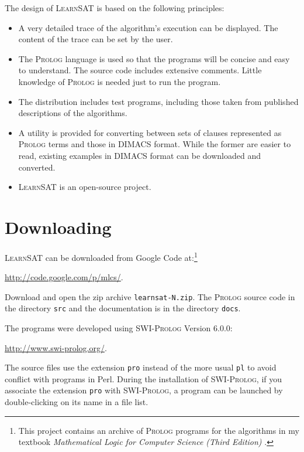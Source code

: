 \documentclass[11pt]{article}
\newcommand*{\p}[1]{\textup{\texttt{#1}}}
\newcommand*{\ls}{\textsc{LearnSAT}}
\newcommand*{\pl}{\textsc{Prolog}}
\newcommand*{\sw}{\textsc{SWI-Prolog}}
\begin{document}
The design of \ls{} is based on the following principles:

\begin{itemize}

\item A very detailed trace of the algorithm's execution can be
displayed. The content of the trace can be set by the user.

\item The \pl{} language is used so that the programs will be concise
and easy to understand. The source code includes extensive comments.
Little knowledge of \pl{} is needed just to run the program.

\item The distribution includes test programs, including those taken
from published descriptions of the algorithms.

\item A utility is provided for converting between sets of clauses
represented as \pl{} terms and those in DIMACS format. While the former
are easier to read, existing examples in DIMACS format can be downloaded
and converted.

\item \ls{} is an open-source project.

\end{itemize}

\section{Downloading}
\ls{} can be downloaded from Google Code at:\footnote{This project
contains an archive of \pl{} programs for the algorithms in my textbook
\emph{Mathematical Logic for Computer Science (Third Edition)}
\cite{mlcs}.}
\begin{center}
\url{http://code.google.com/p/mlcs/}.
\end{center}

Download and open the zip archive \p{learnsat-N.zip}. The \pl{} source
code in the directory \p{src} and the documentation is in the directory
\p{docs}.

The programs were developed using \sw{} Version 6.0.0:
\begin{center}
\url{http://www.swi-prolog.org/}.
\end{center}
The source files use the extension \p{pro} instead of the more usual
\p{pl} to avoid conflict with programs in Perl. During the installation
of \sw{}, if you associate the extension \p{pro} with \sw{}, a
program can be launched by double-clicking on its name in a file list. 
\end{document}
